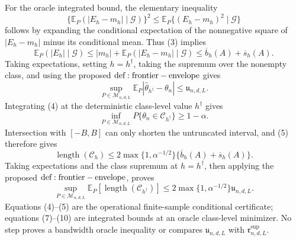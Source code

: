 For the oracle integrated bound, the elementary inequality
\[
 \{\mathbb E_P(|E_h-m_h|\mid\mathcal G)\}^2
 \leq\mathbb E_P\{(E_h-m_h)^2\mid\mathcal G\}
\]
follows by expanding the conditional expectation of the nonnegative square of \(|E_h-m_h|\) minus its conditional mean.  Thus (3) implies
\[
 \mathbb E_P(|E_h|\mid\mathcal G)
 \leq |m_h|+\mathbb E_P(|E_h-m_h|\mid\mathcal G)
 \leq\overline b_h(A)+\overline s_h(A).
\tag{6}
\]
Taking expectations, setting \(h=h^\dagger\), taking the supremum over the nonempty class, and using the proposed \({\rm def:frontier-envelope}\) gives
\[
 \sup_{P\in\mathcal M_{n,d,L}}
 \mathbb E_P|\widehat\theta_{h^\dagger}-\theta_n|
 \leq\mathfrak u_{n,d,L}.
\tag{7}
\]
Integrating (4) at the deterministic class-level value \(h^\dagger\) gives
\[
 \inf_{P\in\mathcal M_{n,d,L}}
 P\{\theta_n\in\mathcal C_{h^\dagger}\}\geq1-\alpha.
\tag{8}
\]
Intersection with \([-B,B]\) can only shorten the untruncated interval, and (5) therefore gives
\[
 \operatorname{length}(\mathcal C_h)
 \leq2\max\{1,\alpha^{-1/2}\}
 \{\overline b_h(A)+\overline s_h(A)\}.
\tag{9}
\]
Taking expectations and the class supremum at \(h=h^\dagger\), then applying the proposed \({\rm def:frontier-envelope}\), proves
\[
 \sup_{P\in\mathcal M_{n,d,L}}
 \mathbb E_P[\operatorname{length}(\mathcal C_{h^\dagger})]
 \leq2\max\{1,\alpha^{-1/2}\}\mathfrak u_{n,d,L}.
\tag{10}
\]
Equations (4)--(5) are the operational finite-sample conditional certificate; equations (7)--(10) are integrated bounds at an oracle class-level minimizer.  No step proves a bandwidth oracle inequality or compares \(\mathfrak u_{n,d,L}\) with \(\mathfrak r^{\mathrm{sup}}_{n,d,L}\).